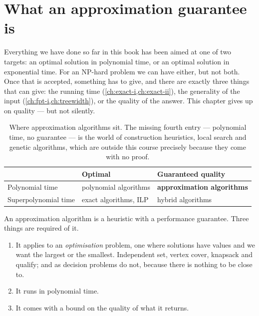 \section{What an approximation guarantee is}
\label{sec:approx-definitions}

Everything we have done so far in this book has been aimed at one of two
targets: an optimal solution in polynomial time, or an optimal solution in
exponential time. For an \textrm{NP}-hard problem we can have either, but not
both. Once that is accepted, something has to give, and there are exactly three
things that can give: the running time (\cref{ch:exact-i,ch:exact-ii}), the
generality of the input (\cref{ch:fpt-i,ch:treewidth}), or the quality of the
answer. This chapter gives up on quality --- but not silently.

\begin{table}[ht]
\centering
\begin{tabular}{@{}lll@{}}
\toprule
 & \textbf{Optimal} & \textbf{Guaranteed quality} \\
\midrule
Polynomial time     & polynomial algorithms & \textbf{approximation algorithms} \\
Superpolynomial time & exact algorithms, ILP & hybrid algorithms \\
\bottomrule
\end{tabular}
\caption{Where approximation algorithms sit. The missing fourth entry ---
polynomial time, no guarantee --- is the world of construction heuristics,
local search and genetic algorithms, which are outside this course precisely
because they come with no proof.}
\label{tab:approx-landscape}
\end{table}

An approximation algorithm is a heuristic with a performance guarantee. Three
things are required of it.

\begin{enumerate}[leftmargin=*]
  \item It applies to an \emph{optimisation} problem, one where solutions have
        values and we want the largest or the smallest. Independent set, vertex
        cover, knapsack and  qualify;  and
         as decision problems do not, because there is nothing to
        be close to.
  \item It runs in polynomial time.
  \item It comes with a bound on the quality of what it returns.
\end{enumerate}

